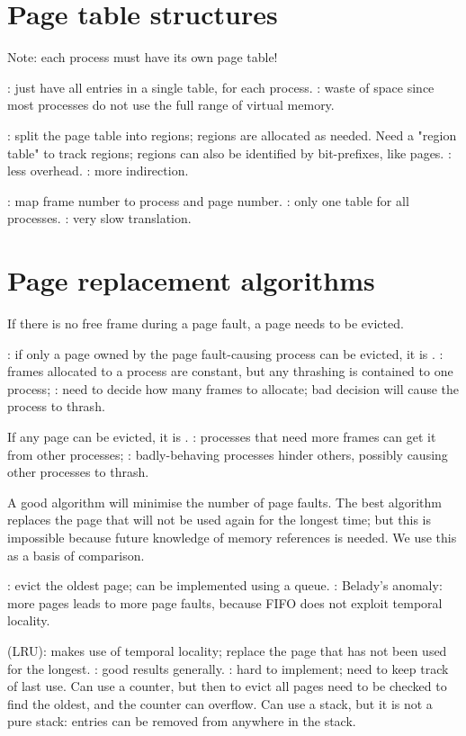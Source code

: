 \documentclass[fontsize=9pt]{slnotes}
\newcommand\benefits{\checkmark}
\newcommand\problems{\textsymbol{✗}}
\begin{document}
\section{Page table structures}
Note: each process must have its own page table!

: just have all entries in a single table, for each process. \problems: waste of space since most processes do not use the full range of virtual memory.

: split the page table into regions; regions are allocated as needed. Need a "region table" to track regions; regions can also be identified by bit-prefixes, like pages. \benefits: less overhead. \problems: more indirection.

: map frame number to process and page number. \benefits: only one table for all processes. \problems: very slow translation.

\section{Page replacement algorithms}
If there is no free frame during a page fault, a page needs to be evicted.

: if only a page owned by the page fault-causing process can be evicted, it is . \benefits: frames allocated to a process are constant, but any thrashing is contained to one process; \problems: need to decide how many frames to allocate; bad decision will cause the process to thrash.

If any page can be evicted, it is . \benefits: processes that need more frames can get it from other processes; \problems: badly-behaving processes hinder others, possibly causing other processes to thrash.

A good algorithm will minimise the number of page faults. The best algorithm replaces the page that will not be used again for the longest time; but this is impossible because future knowledge of memory references is needed. We use this as a basis of comparison.

: evict the oldest page; can be implemented using a queue. \problems: Belady's anomaly: more pages leads to more page faults, because FIFO does not exploit temporal locality.

 (LRU): makes use of temporal locality; replace the page that has not been used for the longest. \benefits: good results generally. \problems: hard to implement; need to keep track of last use. Can use a counter, but then to evict all pages need to be checked to find the oldest, and the counter can overflow. Can use a stack, but it is not a pure stack: entries can be removed from anywhere in the stack.
\end{document}
